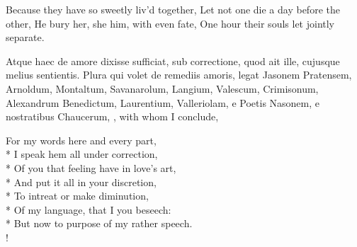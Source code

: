 Because they have so sweetly liv'd together,
Let not one die a day before the other,
He bury her, she him, with even fate,
One hour their souls let jointly separate.


Atque haec de amore dixisse sufficiat, sub correctione, quod ait
ille, cujusque melius sentientis. Plura qui volet de remediis amoris,
legat Jasonem Pratensem, Arnoldum, Montaltum, Savanarolum, Langium,
Valescum, Crimisonum, Alexandrum Benedictum, Laurentium, Valleriolam, e
Poetis Nasonem, e nostratibus Chaucerum, \etc{}, with whom I conclude,

{\gothfont%
\begin{versewithlinenos}{2}{1}{1}%
For my words here and every part,\\*
I speak hem all under correction,\\*
Of you that feeling have in love's art,\\*
And put it all in your discretion,\\*
To intreat or make diminution,\\*
Of my language, that I you beseech:\\*
But now to purpose of my rather speech.\\!
\end{versewithlinenos}%
}%
